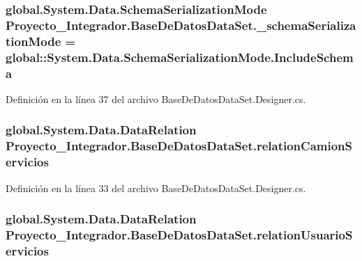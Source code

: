 \subsubsection[{\-\_\-schema\-Serialization\-Mode}]{\setlength{\rightskip}{0pt plus 5cm}global.\-System.\-Data.\-Schema\-Serialization\-Mode Proyecto\-\_\-\-Integrador.\-Base\-De\-Datos\-Data\-Set.\-\_\-schema\-Serialization\-Mode = global\-::\-System.\-Data.\-Schema\-Serialization\-Mode.\-Include\-Schema\hspace{0.3cm}{\ttfamily [private]}}\label{class_proyecto___integrador_1_1_base_de_datos_data_set_ac2615c9a323b120cc73d05edeaf8319e}


Definición en la línea 37 del archivo Base\-De\-Datos\-Data\-Set.\-Designer.\-cs.

\subsubsection[{relation\-Camion\-Servicios}]{\setlength{\rightskip}{0pt plus 5cm}global.\-System.\-Data.\-Data\-Relation Proyecto\-\_\-\-Integrador.\-Base\-De\-Datos\-Data\-Set.\-relation\-Camion\-Servicios\hspace{0.3cm}{\ttfamily [private]}}\label{class_proyecto___integrador_1_1_base_de_datos_data_set_a9e463069444b2a45c9c8b6ffeb742034}


Definición en la línea 33 del archivo Base\-De\-Datos\-Data\-Set.\-Designer.\-cs.

\subsubsection[{relation\-Usuario\-Servicios}]{\setlength{\rightskip}{0pt plus 5cm}global.\-System.\-Data.\-Data\-Relation Proyecto\-\_\-\-Integrador.\-Base\-De\-Datos\-Data\-Set.\-relation\-Usuario\-Servicios\hspace{0.3cm}{\ttfamily [private]}}\label{class_proyecto___integrador_1_1_base_de_datos_data_set_ab509f1f255255f9bf38392c8e274342e}


